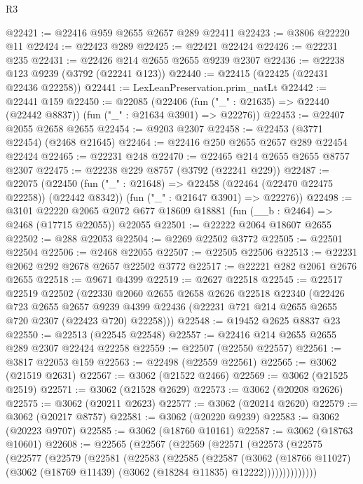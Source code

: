 \begin{lexlean}{R3}
\begin{coremodule}
@22421 := @22416 @959 @2655 @2657 @289 @22411
@22423 := @3806 @22220 @11
@22424 := @22423 @289
@22425 := @22421 @22424
@22426 := @22231 @235
@22431 := @22426 @214 @2655 @2655 @9239 @2307
@22436 := @22238 @123 @9239 (@3792 (@22241 @123))
@22440 := @22415 (@22425 (@22431 @22436 @22258))
@22441 := LexLeanPreservation.prim_natLt
@22442 := @22441 @159
@22450 := @22085
    (@22406 (fun ("_" : @21635) => @22440 (@22442 @8837)) (fun ("_" : @21634 @3901) => @22276))
@22453 := @22407 @2055 @2658 @2655
@22454 := @9203 @2307
@22458 := @22453 (@3771 @22454) (@2468 @21645)
@22464 := @22416 @250 @2655 @2657 @289 @22454 @22424
@22465 := @22231 @248
@22470 := @22465 @214 @2655 @2655 @8757 @2307
@22475 := @22238 @229 @8757 (@3792 (@22241 @229))
@22487 := @22075
    (@22450
      (fun ("_" : @21648) => @22458 (@22464 (@22470 @22475 @22258)) (@22442 @8342))
      (fun ("_" : @21647 @3901) => @22276))
@22498 := @3101
    @22220
    @2065
    @2072
    @677
    @18609
    @18881
    (fun (__b : @2464) => @2468 (@17715 @22055))
    @22055
@22501 := @22222 @2064 @18607 @2655
@22502 := @288 @22053
@22504 := @2269 @22502 @3772
@22505 := @22501 @22504
@22506 := @2468 @22055
@22507 := @22505 @22506
@22513 := @22231 @2062 @292 @2678 @2657 @22502 @3772
@22517 := @22221 @282 @2061 @2676 @2655
@22518 := @9671 @4399
@22519 := @2627 @22518
@22545 := @22517
    @22519
    @22502
    (@22330
      @2060
      @2655
      @2658
      @2626
      @22518
      @22340
      (@22426
        @723
        @2655
        @2657
        @9239
        @4399
        @22436
        (@22231 @721 @214 @2655 @2655 @720 @2307 (@22423 @720) @22258)))
@22548 := @19452 @2625 @8837 @23
@22550 := @22513 (@22545 @22548)
@22557 := @22416 @214 @2655 @2655 @289 @2307 @22424 @22258
@22559 := @22507 (@22550 @22557)
@22561 := @3817 @22053 @159
@22563 := @22498 (@22559 @22561)
@22565 := @3062 (@21519 @2631)
@22567 := @3062 (@21522 @2466)
@22569 := @3062 (@21525 @2519)
@22571 := @3062 (@21528 @2629)
@22573 := @3062 (@20208 @2626)
@22575 := @3062 (@20211 @2623)
@22577 := @3062 (@20214 @2620)
@22579 := @3062 (@20217 @8757)
@22581 := @3062 (@20220 @9239)
@22583 := @3062 (@20223 @9707)
@22585 := @3062 (@18760 @10161)
@22587 := @3062 (@18763 @10601)
@22608 := @22565
    (@22567
      (@22569
        (@22571
          (@22573
            (@22575
              (@22577
                (@22579
                  (@22581
                    (@22583
                      (@22585
                        (@22587
                          (@3062
                            (@18766 @11027)
                            (@3062 (@18769 @11439) (@3062 (@18284 @11835) @12222))))))))))))))

\end{coremodule}
\end{lexlean}
